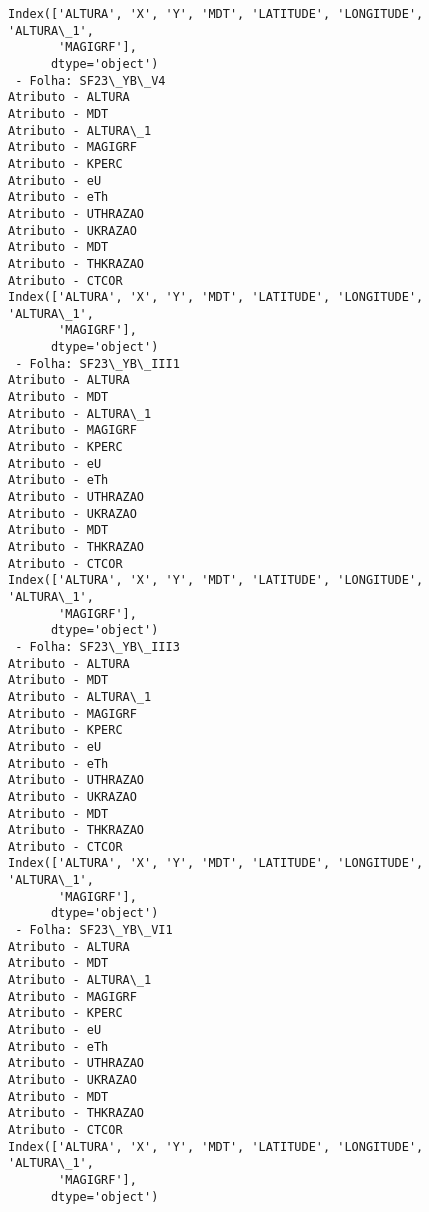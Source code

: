 \documentclass[11pt]{article}
\begin{document}
\begin{Verbatim}[commandchars=\\\{\}]
Index(['ALTURA', 'X', 'Y', 'MDT', 'LATITUDE', 'LONGITUDE', 'ALTURA\_1',
       'MAGIGRF'],
      dtype='object')
 - Folha: SF23\_YB\_V4
Atributo - ALTURA
Atributo - MDT
Atributo - ALTURA\_1
Atributo - MAGIGRF
Atributo - KPERC
Atributo - eU
Atributo - eTh
Atributo - UTHRAZAO
Atributo - UKRAZAO
Atributo - MDT
Atributo - THKRAZAO
Atributo - CTCOR
Index(['ALTURA', 'X', 'Y', 'MDT', 'LATITUDE', 'LONGITUDE', 'ALTURA\_1',
       'MAGIGRF'],
      dtype='object')
 - Folha: SF23\_YB\_III1
Atributo - ALTURA
Atributo - MDT
Atributo - ALTURA\_1
Atributo - MAGIGRF
Atributo - KPERC
Atributo - eU
Atributo - eTh
Atributo - UTHRAZAO
Atributo - UKRAZAO
Atributo - MDT
Atributo - THKRAZAO
Atributo - CTCOR
Index(['ALTURA', 'X', 'Y', 'MDT', 'LATITUDE', 'LONGITUDE', 'ALTURA\_1',
       'MAGIGRF'],
      dtype='object')
 - Folha: SF23\_YB\_III3
Atributo - ALTURA
Atributo - MDT
Atributo - ALTURA\_1
Atributo - MAGIGRF
Atributo - KPERC
Atributo - eU
Atributo - eTh
Atributo - UTHRAZAO
Atributo - UKRAZAO
Atributo - MDT
Atributo - THKRAZAO
Atributo - CTCOR
Index(['ALTURA', 'X', 'Y', 'MDT', 'LATITUDE', 'LONGITUDE', 'ALTURA\_1',
       'MAGIGRF'],
      dtype='object')
 - Folha: SF23\_YB\_VI1
Atributo - ALTURA
Atributo - MDT
Atributo - ALTURA\_1
Atributo - MAGIGRF
Atributo - KPERC
Atributo - eU
Atributo - eTh
Atributo - UTHRAZAO
Atributo - UKRAZAO
Atributo - MDT
Atributo - THKRAZAO
Atributo - CTCOR
Index(['ALTURA', 'X', 'Y', 'MDT', 'LATITUDE', 'LONGITUDE', 'ALTURA\_1',
       'MAGIGRF'],
      dtype='object')
    \end{Verbatim}
\end{document}
